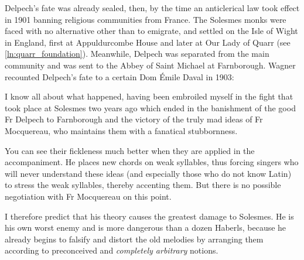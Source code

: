 Delpech's fate was already sealed, then, by the time an anticlerical law took effect in 1901 banning religious communities from France.
The Solesmes monks were faced with no alternative other than to emigrate, and settled on the Isle of Wight in England, first at Appuldurcombe House and later at Our Lady of Quarr (see \cref{ln:quarr_foundation}).
Meanwhile, Delpech was separated from the main community and was sent to the Abbey of Saint Michael at Farnborough.
Wagner recounted Delpech's fate to a certain Dom Émile Daval in 1903:

%
  {}
{I know all about what happened, having been embroiled myself in the fight that took place at Solesmes two years ago which ended in the banishment of the good Fr Delpech to Farnborough and the victory of the truly mad ideas of Fr Mocquereau, who maintains them with a fanatical stubbornness.

\parindent=10pt
You can see their fickleness much better when they are applied in the accompaniment. He places new chords on weak syllables, thus forcing singers who will never understand these ideas (and especially those who do not know Latin) to stress the weak syllables, thereby accenting them. But there is no possible negotiation with Fr Mocquereau on this point.

\parindent=10pt
I therefore predict that his theory causes the greatest damage to Solesmes. He is his own worst enemy and is more dangerous than a dozen Haberls, because he already begins to falsify and distort the old melodies by arranging them according to preconceived and \emph{completely arbitrary} notions.}
